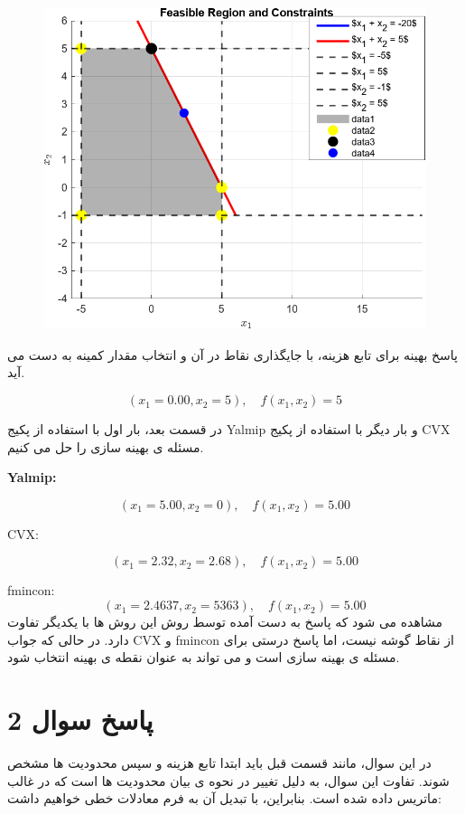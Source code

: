 \begin{figure}[H]
	\centering
	\includegraphics[width=1\linewidth]{../img/Q2_11}
	\caption{}
	\label{fig:q21}
\end{figure}

	
پاسخ بهینه برای تابع هزینه، با جایگذاری نقاط در آن و انتخاب مقدار کمینه به دست می آید.

\[
(x_1 = 0.00, x_2 = 5) , \quad f(x_1, x_2) = 5
\]

در قسمت بعد، بار اول با استفاده از پکیج 
Yalmip
و بار دیگر با استفاده از پکیج 
CVX
مسئله ی بهینه سازی را حل می کنیم.

\textbf{Yalmip:}


\[
(x_1 = 5.00, x_2 = 0) , \quad f(x_1, x_2) = 5.00
\]

CVX:

\[
(x_1 = 2.32, x_2 = 2.68) , \quad f(x_1, x_2) = 5.00
\]

fmincon:
\[
(x_1 = 2.4637, x_2 = 5363) , \quad f(x_1, x_2) = 5.00
\]
مشاهده می شود که پاسخ به دست آمده توسط روش این روش ها با یکدیگر تفاوت دارد. در حالی که جواب CVX و fmincon از نقاط گوشه نیست، اما پاسخ درستی برای مسئله ی بهینه سازی است و می تواند به عنوان نقطه ی بهینه انتخاب شود.



\section{پاسخ سوال 2}
در این سوال، مانند قسمت قبل باید ابتدا تابع هزینه و سپس محدودیت ها مشخص شوند. تفاوت این سوال، به دلیل تغییر در نحوه ی بیان محدودیت ها است که در غالب ماتریس داده شده است. بنابراین، با تبدیل آن به فرم معادلات خطی خواهیم داشت:

